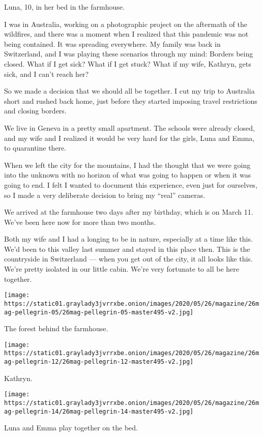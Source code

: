 Luna, 10, in her bed in the farmhouse.

I was in Australia, working on a photographic project on the aftermath
of the wildfires, and there was a moment when I realized that this
pandemic was not being contained. It was spreading everywhere. My family
was back in Switzerland, and I was playing these scenarios through my
mind: Borders being closed. What if I get sick? What if I get stuck?
What if my wife, Kathryn, gets sick, and I can't reach her?

So we made a decision that we should all be together. I cut my trip to
Australia short and rushed back home, just before they started imposing
travel restrictions and closing borders.

We live in Geneva in a pretty small apartment. The schools were already
closed, and my wife and I realized it would be very hard for the girls,
Luna and Emma, to quarantine there.

When we left the city for the mountains, I had the thought that we were
going into the unknown with no horizon of what was going to happen or
when it was going to end. I felt I wanted to document this experience,
even just for ourselves, so I made a very deliberate decision to bring
my ``real'' cameras.

We arrived at the farmhouse two days after my birthday, which is on
March 11. We've been here now for more than two months.

Both my wife and I had a longing to be in nature, especially at a time
like this. We'd been to this valley last summer and stayed in this place
then. This is the countryside in Switzerland --- when you get out of the
city, it all looks like this. We're pretty isolated in our little cabin.
We're very fortunate to all be here together.

\texttt{[image: https://static01.graylady3jvrrxbe.onion/images/2020/05/26/magazine/26mag-pellegrin-05/26mag-pellegrin-05-master495-v2.jpg]}

The forest behind the farmhouse.

\texttt{[image: https://static01.graylady3jvrrxbe.onion/images/2020/05/26/magazine/26mag-pellegrin-12/26mag-pellegrin-12-master495-v2.jpg]}

Kathryn.

\texttt{[image: https://static01.graylady3jvrrxbe.onion/images/2020/05/26/magazine/26mag-pellegrin-14/26mag-pellegrin-14-master495-v2.jpg]}

Luna and Emma play together on the bed.

